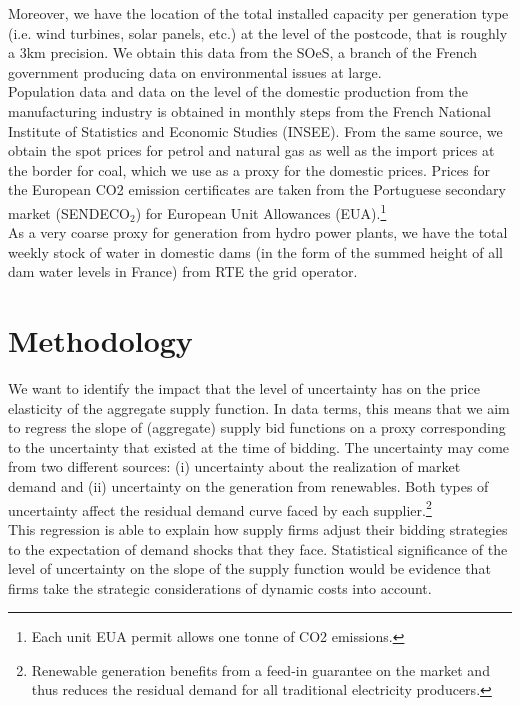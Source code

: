 Moreover, we have the location of the total installed capacity per generation type (i.e. wind turbines, solar panels, etc.) at the level of the postcode, that is roughly a 3km precision. We obtain this data from the SOeS, a branch of the French government producing data on environmental issues at large. \\

Population data and data on the level of the domestic production from the manufacturing industry is obtained in monthly steps from the French National Institute of Statistics and Economic Studies (INSEE). From the same source, we obtain the spot prices for petrol and natural gas as well as the import prices at the border for coal, which we use as a proxy for the domestic prices. Prices for the European CO2 emission certificates are taken from the Portuguese secondary market (SENDECO$_2$) for European Unit Allowances (EUA).\footnote{Each unit EUA permit allows one tonne of CO2 emissions.}\\

As a very coarse proxy for generation from hydro power plants, we have the total weekly stock of water in domestic dams (in the form of the summed height of all dam water levels in France) from RTE the grid operator.


\section{Methodology}
\label{newapproach}
We want to identify the impact that the level of uncertainty has on the price elasticity of the aggregate supply function. In data terms, this means that we aim to regress the slope of (aggregate) supply bid functions on a proxy corresponding to the uncertainty that existed at the time of bidding. The uncertainty may come from two different sources: (i) uncertainty about the realization of market demand and (ii) uncertainty on the generation from renewables. Both types of uncertainty affect the residual demand curve faced by each supplier.\footnote{Renewable generation benefits from a feed-in guarantee on the market and thus reduces the residual demand for all traditional electricity producers.}\\

This regression is able to explain how supply firms adjust their bidding strategies to the expectation of demand shocks that they face. Statistical significance of the level of uncertainty on the slope of the supply function would be evidence that firms take the strategic considerations of dynamic costs into account. \\

